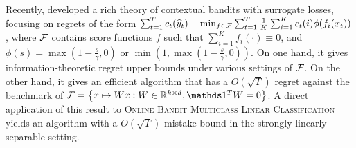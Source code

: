 
Recently, \citet{Foster-Krishnamurthy-2018} developed a rich theory of
contextual bandits with surrogate losses, focusing on regrets of the form
$\sum_{t=1}^T c_t(\widehat{y}_t) - \min_{f \in \mathcal{F}} \sum_{t=1}^T \frac{1}{K}
\sum_{i=1}^K c_t(i) \phi( f_i(x_t) )$, where $\mathcal{F}$ contains score functions
$f$ such that $\sum_{i=1}^K f_i(\cdot) \equiv 0$, and $\phi(s) = \max(1 - \frac
s \gamma, 0)$ or $\min(1, \max(1 - \frac s \gamma, 0))$. On one hand, it gives
information-theoretic regret upper bounds under various settings of $\mathcal{F}$.
On the other hand, it gives an
efficient algorithm that has a $O(\sqrt{T})$ regret against the benchmark of
$\calF = \cbr{x \mapsto W x: W \in \R^{k \times d}, \one^T W = 0}$. A direct
application of this result to \textsc{Online Bandit Multiclass Linear
Classification} yields an algorithm with a $O(\sqrt{T})$ mistake bound in the
strongly linearly separable setting.



